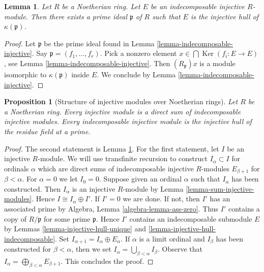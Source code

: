 \documentclass{stacks-project}
\theoremstyle{plain}
\newtheorem{proposition}[subsection]{Proposition}
\newtheorem{lemma}[subsection]{Lemma}
\theoremstyle{definition}
\theoremstyle{remark}
\numberwithin{equation}{subsection}
\def\Ker{\mathop{\mathrm{Ker}}}
\begin{document}
\begin{lemma}
\label{lemma-indecomposable-injective-noetherian}
Let $R$ be a Noetherian ring. Let $E$ be an indecomposable injective
$R$-module. Then there exists a prime ideal $\mathfrak p$ of $R$ such that
$E$ is the injective hull of $\kappa(\mathfrak p)$.
\end{lemma}

\begin{proof}
Let $\mathfrak p$ be the prime ideal found in
Lemma \ref{lemma-indecomposable-injective}.
Say $\mathfrak p = (f_1, \ldots, f_r)$.
Pick a nonzero element $x \in \bigcap \Ker(f_i : E \to E)$,
see Lemma \ref{lemma-indecomposable-injective}.
Then $(R_\mathfrak p)x$ is a module isomorphic to $\kappa(\mathfrak p)$
inside $E$. We conclude by Lemma \ref{lemma-indecomposable-injective}.
\end{proof}

\begin{proposition}[Structure of injective modules over Noetherian rings]
\label{proposition-structure-injectives-noetherian}
Let $R$ be a Noetherian ring.
Every injective module is a direct sum of indecomposable injective modules.
Every indecomposable injective module is the injective hull of
the residue field at a prime.
\end{proposition}

\begin{proof}
The second statement is Lemma \ref{lemma-indecomposable-injective-noetherian}.
For the first statement, let $I$ be an injective $R$-module.
We will use transfinite recursion to construct $I_\alpha \subset I$
for ordinals $\alpha$ which are direct sums of indecomposable injective
$R$-modules $E_{\beta + 1}$ for $\beta < \alpha$.
For $\alpha = 0$ we let $I_0 = 0$. Suppose given an ordinal $\alpha$
such that $I_\alpha$ has been constructed. Then $I_\alpha$ is an
injective $R$-module by Lemma \ref{lemma-sum-injective-modules}.
Hence $I \cong I_\alpha \oplus I'$. If $I' = 0$ we are done.
If not, then $I'$ has an associated prime by
Algebra, Lemma \ref{algebra-lemma-ass-zero}.
Thus $I'$ contains a copy of $R/\mathfrak p$ for some prime $\mathfrak p$.
Hence $I'$ contains an indecomposable submodule $E$ by
Lemmas \ref{lemma-injective-hull-unique} and
\ref{lemma-injective-hull-indecomposable}. Set
$I_{\alpha + 1} = I_\alpha \oplus E_\alpha$.
If $\alpha$ is a limit ordinal and $I_\beta$ has been constructed
for $\beta < \alpha$, then we set
$I_\alpha = \bigcup_{\beta < \alpha} I_\beta$.
Observe that $I_\alpha = \bigoplus_{\beta < \alpha} E_{\beta + 1}$.
This concludes the proof.
\end{proof}
\end{document}
